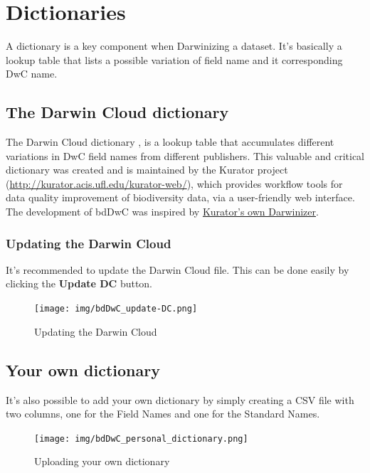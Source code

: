 \documentclass[]{book}
\begin{document}
\section{Dictionaries}\label{dictionaries}

A dictionary is a key component when Darwinizing a dataset. It's
basically a lookup table that lists a possible variation of field name
and it corresponding DwC name.

\hypertarget{the-darwin-cloud-dictionary}{\subsection{The Darwin Cloud
dictionary}\label{the-darwin-cloud-dictionary}}

The Darwin Cloud dictionary \citep{DarwinCloud}, is a lookup table that
accumulates different variations in DwC field names from different
publishers. This valuable and critical dictionary was created and is
maintained by the Kurator project
(\url{http://kurator.acis.ufl.edu/kurator-web/}), which provides
workflow tools for data quality improvement of biodiversity data, via a
user-friendly web interface. The development of bdDwC was inspired by
\href{https://github.com/kurator-org/kurator-validation/wiki/CSV-File-Darwinizer\%20target=\%22_blank\%22}{Kurator's
own Darwinizer}.

\subsubsection*{Updating the Darwin
Cloud}\label{updating-the-darwin-cloud}

It's recommended to update the Darwin Cloud file. This can be done
easily by clicking the \textbf{Update DC} button.

\begin{figure}
\centering
\texttt{[image: img/bdDwC\_update-DC.png]}
\caption{Updating the Darwin Cloud}
\end{figure}

\subsection{Your own dictionary}\label{your-own-dictionary}

It's also possible to add your own dictionary by simply creating a CSV
file with two columns, one for the Field Names and one for the Standard
Names.

\begin{figure}
\centering
\texttt{[image: img/bdDwC\_personal\_dictionary.png]}
\caption{Uploading your own dictionary}
\end{figure}
\end{document}
